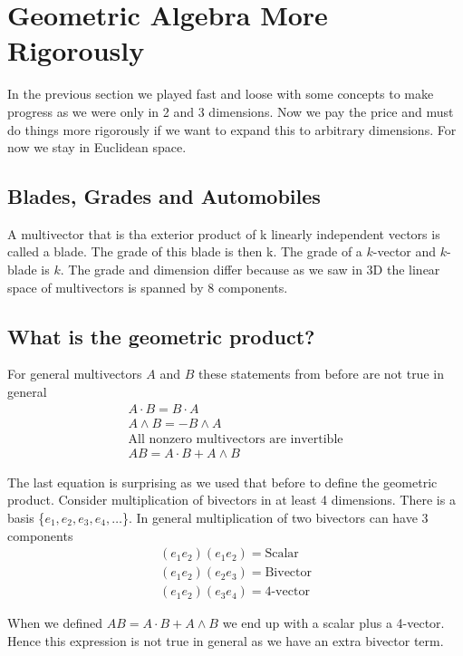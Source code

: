 \documentclass[options]{report}
\begin{document}
\section{Geometric Algebra More Rigorously}
In the previous section we played fast and loose with some concepts to make progress as we were only in 2 and 3 dimensions. Now we pay the price and must do things more rigorously if we want to expand this to arbitrary dimensions. For now we stay in Euclidean space.

\subsection{Blades, Grades and Automobiles}
A multivector that is tha exterior product of k linearly independent vectors is called a blade. The grade of this blade is then k. The grade of a $k$-vector and $k$-blade is $k$. The grade and dimension differ because as we saw in 3D the linear space of multivectors is spanned by 8 components.

\subsection{What is the geometric product?}
For general multivectors $A$ and $B$ these statements from before are not true in general
\begin{equation*}
	\begin{gathered}
		A \cdot B = B \cdot A \\
		A \wedge B = - B \wedge A \\
		\text{All nonzero multivectors are invertible} \\
		AB = A \cdot B + A \wedge B
	\end{gathered}
\end{equation*}

The last equation is surprising as we used that before to define the geometric product. Consider multiplication of bivectors in at least 4 dimensions. There is a basis \{$e_1, e_2, e_3, e_4, \dots$\}. In general multiplication of two bivectors can have 3 components
\begin{equation*}
	\begin{gathered}
		(e_1 e_2) (e_1 e_2) = \text{Scalar} \\
		(e_1 e_2) (e_2 e_3) = \text{Bivector} \\
		(e_1 e_2) (e_3 e_4) = \text{4-vector}
	\end{gathered}
\end{equation*}

When we defined $AB = A \cdot B + A \wedge B$ we end up with a scalar plus a 4-vector. Hence this expression is not true in general as we have an extra bivector term.
\end{document}
